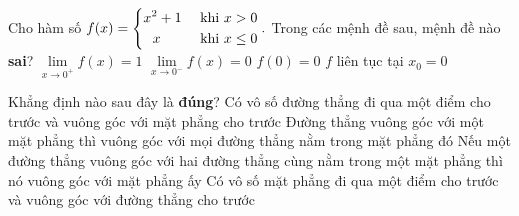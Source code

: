 \begin{ex}%
    Cho hàm số $f(x) = \left\{\begin{aligned} & x^2 + 1 & \text{ khi } x> 0 \\ & \ \ x & \text{ khi } x \le 0\end{aligned}\right..$ Trong các mệnh đề sau, mệnh đề nào {\bf sai}?
    \choice
    {$\lim\limits_{x \to 0^+} f(x) = 1$}
    {$\lim\limits_{x \to 0^-} f(x) = 0$}
    {$f(0) = 0$}
    {\True $f$ liên tục tại $x_0 = 0$}
\end{ex}

\begin{ex}%
    Khẳng định nào sau đây là {\bf đúng}?
    \choice
    {Có vô số đường thẳng đi qua một điểm cho trước và vuông góc với mặt phẳng cho trước}
    {\True Đường thẳng vuông góc với một mặt phẳng thì vuông góc với mọi đường thẳng nằm trong mặt phẳng đó}
    {Nếu một đường thẳng vuông góc với hai đường thẳng cùng nằm trong một mặt phẳng thì nó vuông góc với mặt phẳng ấy}
    {Có vô số mặt phẳng đi qua một điểm cho trước và vuông góc với đường thẳng cho trước}
\end{ex}

